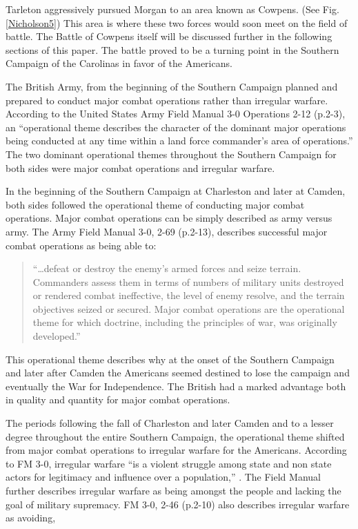 Tarleton aggressively pursued Morgan to an area known as Cowpens. 
(See Fig. \ref{Nicholson5}) This area is where these two forces would soon meet on the
field of battle.  The Battle of Cowpens itself will be discussed further in the
following sections of this paper.  The battle proved to be a turning point in
the Southern Campaign of the Carolinas in favor of the Americans. 

The British Army, from the beginning of the Southern Campaign planned and
prepared to conduct major combat operations rather than irregular warfare.
According to the United States Army Field Manual 3-0 Operations 2-12 (p.2-3), an
“operational theme describes the character of the dominant major operations
being conducted at any time within a land force commander’s area of operations.”
The two dominant operational themes throughout the Southern Campaign for both
sides were major combat operations and irregular warfare. 

In the beginning of the Southern Campaign at Charleston and later at Camden,
both sides followed the operational theme of conducting major combat operations.
Major combat operations can be simply described as army versus army.  The Army
Field Manual 3-0, 2-69 (p.2-13), describes successful major combat operations as
being able to:

\begin{quote} “…defeat or destroy the enemy’s armed forces and seize terrain.
  Commanders assess them in terms of numbers of military units destroyed or
  rendered combat ineffective, the level of enemy resolve, and the terrain
  objectives seized or secured. Major combat operations are the operational
  theme for which doctrine, including the principles of war, was originally
  developed.” \end{quote}

This operational theme describes why at the onset of the Southern Campaign and
later after Camden the Americans seemed destined to lose the campaign and
eventually the War for Independence.  The British had a marked advantage both in
quality and quantity for major combat operations.

The periods following the fall of Charleston and later Camden and to a lesser
degree throughout the entire Southern Campaign, the operational theme shifted
from major combat operations to irregular warfare for the Americans.  According
to FM 3-0, irregular warfare “is a violent struggle among state and non state
actors for legitimacy and influence over a population,” \cite[\S 2-45, pp.
2-10]{fm3-0}.  The Field Manual further describes irregular warfare as being
amongst the people and lacking the goal of military supremacy.  FM 3-0, 2-46
(p.2-10) also describes irregular warfare as avoiding, 


